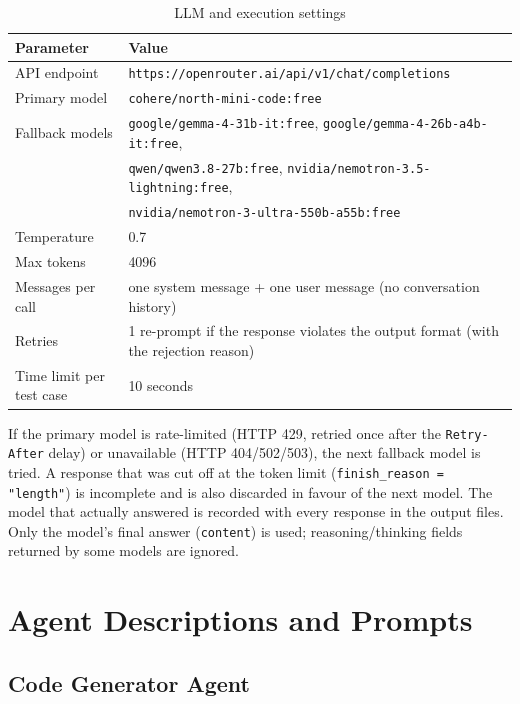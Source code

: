 \documentclass[12pt, a4paper]{article}
\begin{document}
\begin{table}[H]
    \centering
    \begin{tabular}{ll}
        \toprule
        \textbf{Parameter} & \textbf{Value} \\
        \midrule
        API endpoint & \texttt{https://openrouter.ai/api/v1/chat/completions} \\
        Primary model & \texttt{cohere/north-mini-code:free} \\
        Fallback models & \texttt{google/gemma-4-31b-it:free}, \texttt{google/gemma-4-26b-a4b-it:free}, \\
                        & \texttt{qwen/qwen3.8-27b:free}, \texttt{nvidia/nemotron-3.5-lightning:free}, \\
                        & \texttt{nvidia/nemotron-3-ultra-550b-a55b:free} \\
        Temperature & 0.7 \\
        Max tokens & 4096 \\
        Messages per call & one system message + one user message (no conversation history) \\
        Retries & 1 re-prompt if the response violates the output format (with the rejection reason) \\
        Time limit per test case & 10 seconds \\
        \bottomrule
    \end{tabular}
    \caption{LLM and execution settings}
\end{table}

If the primary model is rate-limited (HTTP 429, retried once after the \texttt{Retry-After} delay) or unavailable (HTTP 404/502/503), the next fallback model is tried. A response that was cut off at the token limit (\texttt{finish\_reason = "length"}) is incomplete and is also discarded in favour of the next model. The model that actually answered is recorded with every response in the output files. Only the model's final answer (\texttt{content}) is used; reasoning/thinking fields returned by some models are ignored.

\section{Agent Descriptions and Prompts}

\subsection{Code Generator Agent}
\label{sec:codegen}
\end{document}
